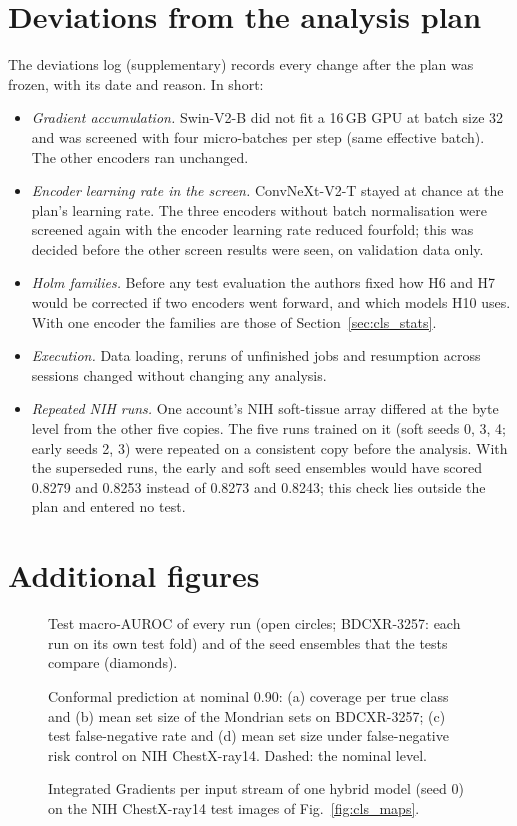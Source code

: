 \section{Deviations from the analysis plan}
\label{app:cls_dev}
The deviations log (supplementary) records every change after the plan was frozen, with its date and reason. In short:
\begin{itemize}
\item \emph{Gradient accumulation.} Swin-V2-B did not fit a 16\,GB GPU at batch size 32 and was screened with four micro-batches per step
  (same effective batch). The other encoders ran unchanged.
\item \emph{Encoder learning rate in the screen.} ConvNeXt-V2-T stayed at chance at the plan's learning rate. The three encoders without
  batch normalisation were screened again with the encoder learning rate reduced fourfold; this was decided before the other screen results
  were seen, on validation data only.
\item \emph{Holm families.} Before any test evaluation the authors fixed how H6 and H7 would be corrected if two encoders went forward, and
  which models H10 uses. With one encoder the families are those of Section~\ref{sec:cls_stats}.
\item \emph{Execution.} Data loading, reruns of unfinished jobs and resumption across sessions changed without changing any analysis.
\item \emph{Repeated NIH runs.} One account's NIH soft-tissue array differed at the byte level from the other five copies. The five runs
  trained on it (soft seeds 0, 3, 4; early seeds 2, 3) were repeated on a consistent copy before the analysis. With the superseded runs,
  the early and soft seed ensembles would have scored 0.8279 and 0.8253 instead of 0.8273 and 0.8243; this check lies outside the plan and
  entered no test.
\end{itemize}

\section{Additional figures}
\begin{figure}[htbp]
\centering
{}
\caption{Test macro-AUROC of every run (open circles; BDCXR-3257: each run on its own test fold) and of the seed ensembles that the tests
compare (diamonds).}
\label{fig:cls_seeds}
\end{figure}

\begin{figure}[htbp]
\centering
{}
\caption{Conformal prediction at nominal 0.90: (a) coverage per true class and (b) mean set size of the Mondrian sets on BDCXR-3257;
(c) test false-negative rate and (d) mean set size under false-negative risk control on NIH ChestX-ray14. Dashed: the nominal level.}
\label{fig:cls_conformal}
\end{figure}

\begin{figure}[htbp]
\centering
{}
\caption{Integrated Gradients per input stream of one hybrid model (seed 0) on the NIH ChestX-ray14 test images of
Fig.~\ref{fig:cls_maps}.}
\label{fig:cls_ig}
\end{figure}
